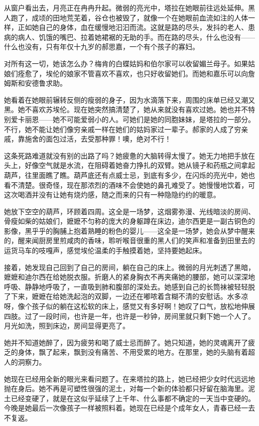 \par 从窗户看出去，月亮正在冉冉升起。微弱的亮光中，塔拉在她眼前往远处延伸。黑人跑了，成顷的田地荒芜着，谷仓也被毁了，就像一个在她眼前血流如注的人体一样，正如她自己的身体，血在缓慢地汩汩而流。这就是路的尽头，发抖的老人、患病的病人、饥饿的嘴巴、拉着她裙裾的无助的手。而在路的尽头，什么也没有——什么也没有，只有年仅十九岁的郝思嘉，一个有个孩子的寡妇。
\par 对所有这一切，她该怎么办？梅肯的白蝶姑妈和伯尔家可以收留媚兰母子。如果姑娘们痊愈了，埃伦的娘家不管喜欢不喜欢，也只好收留她们。而她和嘉乐可以向詹姆斯和安德鲁求助。
\par 她看着在她眼前辗转反侧的瘦弱的身子，因为水滴落下来，周围的床单已经又潮又黑。她不喜欢苏埃伦。现在她突然搞清楚了，她从来就没有喜欢过她。她也并不特别爱卡丽恩——她不可能爱弱小的人。可她们是她的同胞妹妹，是塔拉的一部分。不行，她不能让她们像穷亲戚一样在她们的姑妈家过一辈子。郝家的人成了穷亲戚，靠施舍的面包过活，去受那种罪！噢，绝对不行！
\par 这条死路难道就没有别的出路了吗？她疲惫的大脑转得太慢了。她无力地把手放在头上，好像空气就是水流，在阻碍着她奋力挣扎的双臂。她从镜子和药瓶之间拿起葫芦，往里面瞧了瞧。葫芦底还有点威士忌，到底有多少，在闪烁的亮光中，她也看不清楚。很奇怪，现在那浓烈的酒味不会使她的鼻孔难受了。她慢慢地饮着，可这次喝酒并没有让她有烧灼感，随之而来的只有一种隐隐约约的暖意。
\par 她放下空空的葫芦，环顾着四周。这全是一场梦，这烟雾弥漫、光线暗淡的房间、骨瘦如柴的姑娘们，嬷嬷不匀称的庞大的身躯蹲在床边，迪尔西更是一副古铜色的影像，黑乎乎的胸脯上抱着熟睡的粉色的婴儿——这全是一场梦，她会从梦中醒来的，醒来闻厨房里煎咸肉的香味，聆听喉音很重的黑人们的笑声和准备到田里去的运货马车的吱嘎声，感觉埃伦温柔的手触摸着她，坚持要她起床。
\par 接着，她发现自己回到了自己的房间，躺在自己的床上。微弱的月光刺透了黑暗，嬷嬷和迪尔西在给她脱衣服。折磨人的紧身胸衣不再夹痛她的腰部，她可以深深地呼吸、静静地呼吸了，一直吸到肺和腹部的深处去。她感到自己的长筒袜被轻轻脱了下来，嬷嬷在给她洗起泡的双脚，一边还在嘟哝着含糊不清的安慰话。水多凉呀，像个孩子似的躺在这松软的床上，感觉又有多好啊！她叹了口气，放松地伸展四肢。过了一段时间，也许是一年，也许是一秒钟，房间里就只剩下她一个人了。月光如洗，照到床边，房间显得更亮了。
\par 她并不知道她醉了，因为疲劳和喝了威士忌而醉了。她只知道，她的灵魂离开了疲乏的身体，飘了起来，飘到没有痛苦、不用受累的地方。在那里，她的头脑有着超人的洞察力。
\par 她现在已经用全新的眼光来看问题了。在来塔拉的路上，她已经把少女时代远远地抛在身后。她不再是可塑性很强的泥土，对每一个新的体验都只好留在脑海里。泥土已经变硬了，就是在这似乎延续了上千年、什么事都不确定的一天当中变硬的。今晚是她最后一次像孩子一样被照料着。她现在已经是个成年女人，青春已经一去不复返。
